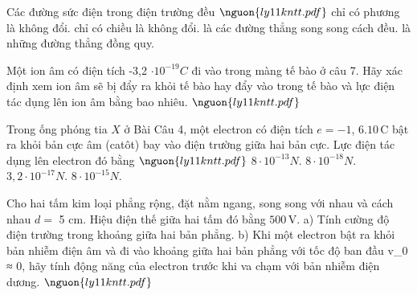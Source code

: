 \begin{ex}
Các đường sức điện trong điện trường đều $\nguon{ly11 kntt.pdf}$
\choice
{chỉ có phương là không đổi.}
{chỉ có chiều là không đổi.}
{\True là các đường thẳng song song cách đều.}
{là những đường thẳng đồng quy.}
\end{ex}

\begin{ex}
Một ion âm có điện tích -3,2 $\cdot10^{-19}C$ đi vào trong màng tế bào ở câu 7. Hãy xác định xem ion âm sẽ bị đẩy ra khỏi tế bào hay đẩy vào trong tế bào và lực điện tác dụng lên ion âm bằng bao nhiêu. $\nguon{ly11 kntt.pdf}$
\choiceTF

\end{ex}

\begin{ex}
Trong ống phóng tia $X$ ở Bài Câu 4, một electron có điện tích $e = -1$, $6.10\,\mathrm{C}$ bật ra khỏi bản cực âm (catôt) bay vào điện trường giữa hai bản cực. Lực điện tác dụng lên electron đó bằng $\nguon{ly11 kntt.pdf}$
\choice
{\True $8 \cdot  10^{-13} N.$}
{$8 \cdot  10^{-18} N.$}
{$3,2 \cdot  10^{-17} N.$}
{$8 \cdot  10^{-15} N.$}
\end{ex}

\begin{ex}
Cho hai tấm kim loại phẳng rộng, đặt nằm ngang, song song với nhau và cách nhau $d =$ 5 $\mathrm{cm}$. Hiệu điện thế giữa hai tấm đó bằng $500\,\mathrm{V}$. a) Tính cường độ điện trường trong khoảng giữa hai bản phẳng. b) Khi một electron bật ra khỏi bản nhiễm điện âm và đi vào khoảng giữa hai bản phẳng với tốc độ ban đầu v_0 ≈ 0, hãy tính động năng của electron trước khi va chạm với bản nhiễm điện dương. $\nguon{ly11 kntt.pdf}$
\choiceTF

\end{ex}

